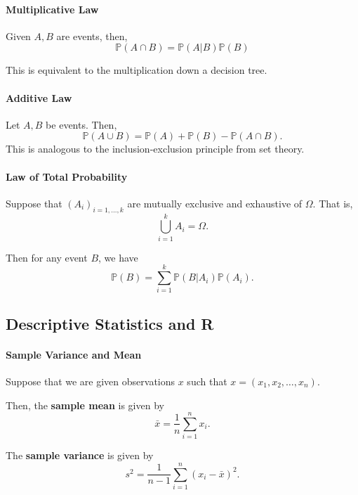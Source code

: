 \paragraph{Multiplicative Law}
Given \(A, B\) are events, then,
\[
    \mathbb{P}(A \cap B) = \mathbb{P}(A | B) \mathbb{P}(B)
\]

This is equivalent to the multiplication down a decision tree.

\paragraph{Additive Law}
Let \(A, B\) be events. Then, \[
    \mathbb{P}(A \cup B) = \mathbb{P}(A) + \mathbb{P}(B) - \mathbb{P}(A \cap B).
\]
This is analogous to the inclusion-exclusion principle from set theory.


\paragraph{Law of Total Probability}
Suppose that \((A_i)_{i = 1, \dots, k}\) are mutually exclusive and
exhaustive of \(\Omega\).
That is, \[
    \bigcup_{i=1}^k A_i = \Omega.
\]

Then for any event \(B\), we have
\[
    \mathbb{P}(B) = \sum_{i=1}^k \mathbb{P}(B | A_i) \mathbb{P}(A_i).
\]

\subsection{Descriptive Statistics and R}

\paragraph{Sample Variance and Mean}
Suppose that we are given observations \(x\) such that
\(x = (x_1, x_2, \dots, x_n)\).

Then, the \textbf{sample mean} is given by
\[
    \bar{x} = \frac{1}{n} \sum_{i=1}^n x_i.
\]

The \textbf{sample variance} is given by
\[
    s^2 = \frac{1}{n-1} \sum_{i=1}^n (x_i - \bar{x})^2.
\]


